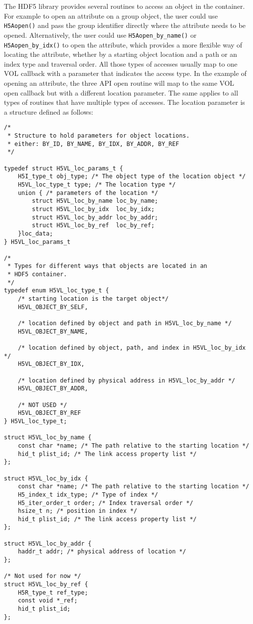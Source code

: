 The HDF5 library provides several routines to access an object in the
container. For example to open an attribute on a group object, the
user could use {\tt H5Aopen()} and pass the group identifier directly
where the attribute needs to be opened. Alternatively, the user could
use {\tt H5Aopen\_by\_name()} or {\tt H5Aopen\_by\_idx()} to open the
attribute, which provides a more flexible way of locating the
attribute, whether by a starting object location and a path or an
index type and traversal order. All those types of accesses usually
map to one VOL callback with a parameter that indicates the access
type. In the example of opening an attribute, the three API open
routine will map to the same VOL open callback but with a different
location parameter. The same applies to all types of routines that
have multiple types of accesses.  The location parameter is a
structure defined as follows:

\begin{lstlisting}
/* 
 * Structure to hold parameters for object locations.
 * either: BY_ID, BY_NAME, BY_IDX, BY_ADDR, BY_REF 
 */

typedef struct H5VL_loc_params_t {
    H5I_type_t obj_type; /* The object type of the location object */
    H5VL_loc_type_t type; /* The location type */
    union { /* parameters of the location */
        struct H5VL_loc_by_name loc_by_name;
        struct H5VL_loc_by_idx  loc_by_idx;
        struct H5VL_loc_by_addr loc_by_addr;
        struct H5VL_loc_by_ref  loc_by_ref;
    }loc_data;
} H5VL_loc_params_t

/* 
 * Types for different ways that objects are located in an 
 * HDF5 container.
 */
typedef enum H5VL_loc_type_t {
    /* starting location is the target object*/
    H5VL_OBJECT_BY_SELF, 

    /* location defined by object and path in H5VL_loc_by_name */
    H5VL_OBJECT_BY_NAME, 

    /* location defined by object, path, and index in H5VL_loc_by_idx */
    H5VL_OBJECT_BY_IDX,

    /* location defined by physical address in H5VL_loc_by_addr */
    H5VL_OBJECT_BY_ADDR,

    /* NOT USED */
    H5VL_OBJECT_BY_REF
} H5VL_loc_type_t;

struct H5VL_loc_by_name {
    const char *name; /* The path relative to the starting location */
    hid_t plist_id; /* The link access property list */
};

struct H5VL_loc_by_idx {
    const char *name; /* The path relative to the starting location */
    H5_index_t idx_type; /* Type of index */
    H5_iter_order_t order; /* Index traversal order */
    hsize_t n; /* position in index */
    hid_t plist_id; /* The link access property list */
};

struct H5VL_loc_by_addr {
    haddr_t addr; /* physical address of location */
};

/* Not used for now */
struct H5VL_loc_by_ref {
    H5R_type_t ref_type;
    const void *_ref;
    hid_t plist_id;
};
\end{lstlisting}

